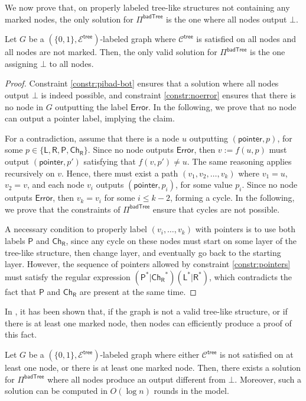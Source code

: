 \documentclass[11pt]{article}
\newcommand{\lparent}{\mathsf {P}}
\newcommand{\lleft}{\mathsf {L}}
\newcommand{\lright}{\mathsf {R}}
\newcommand{\lrch}{\ensuremath{\mathsf {Ch_R}}}
\newcommand{\lerror}{\mathsf {Error}}
\newcommand{\ltreelike}{\mathsf {tree}}
\newcommand{\lpointer}{\mathsf {pointer}}
\newcommand{\lbadtree}{\mathsf {badTree}}
\begin{document}
We now prove that, on properly labeled tree-like structures not containing any marked nodes, the only solution for  $\Pi^{\lbadtree}$ is the one where all nodes output $\bot$.
\begin{lemma}\label{lem:valid-sol-for-badtree}
	Let $G$ be a $(\{0,1\},\mathcal{E^\ltreelike})$-labeled graph where $\mathcal{C}^{\ltreelike}$ is satisfied on all nodes and all nodes are not marked. Then, the only valid solution for $\Pi^{\lbadtree}$ is the one assigning $\bot$ to all nodes.
\end{lemma}
\begin{proof}
	Constraint \ref{constr:pibad-bot} ensures that a solution where all nodes output $\bot$ is indeed possible, and constraint \ref{constr:noerror} ensures that there is no node in $G$ outputting the label $\lerror$. In the following, we prove that no node can output a pointer label, implying the claim.
	
	For a contradiction, assume that there is a node $u$ outputting $(\lpointer, p)$, for some $p \in \{\lleft,\lright, \lparent,\lrch\}$. Since no node outputs $\lerror$, then $v:=f(u, p)$ must output $(\lpointer, p')$ satisfying that $f(v,p')\neq u$. The same reasoning applies recursively on $v$. Hence, there must exist a path $(v_1, v_2, \ldots, v_k)$ where $v_1=u$, $v_2=v$, and each node $v_i$ outputs $(\lpointer,p_i)$, for some value $p_i$. Since no node outputs $\lerror$, then $v_k=v_i$ for some $i\le k-2$, forming a cycle. In the following, we prove that the constraints of $\Pi^{\lbadtree}$ ensure that cycles are not possible. 
	
	A necessary condition to properly label $(v_i, \ldots, v_k)$ with pointers is to use both labels $\lparent$ and $\lrch$, since any cycle on these nodes must start on some layer of the tree-like structure, then change layer, and eventually go back to the starting layer. However, the sequence of pointers allowed by constraint \ref{constr:pointers} must satisfy the regular expression $(\lparent^*|\lrch^*)(\lleft^*|\lright^*)$, which contradicts the fact that $\lparent$ and $\lrch$ are present at the same time.
\end{proof}


In \cite{congest-lcls}, it has been shown that, if the graph is not a valid tree-like structure, or if there is at least one marked node, then nodes can efficiently produce a proof of this fact.
\begin{lemma}\label{lem:prove-tree-invalid}
	Let $G$ be a $(\{0,1\},\mathcal{E^\ltreelike})$-labeled graph where either $\mathcal{C}^{\ltreelike}$ is not satisfied on at least one node, or there is at least one marked node. Then, there exists a solution for $\Pi^{\lbadtree}$ where all nodes produce an output different from $\bot$. Moreover, such a solution can be computed in $O(\log n)$ rounds in the \local model.
\end{lemma}
\end{document}
